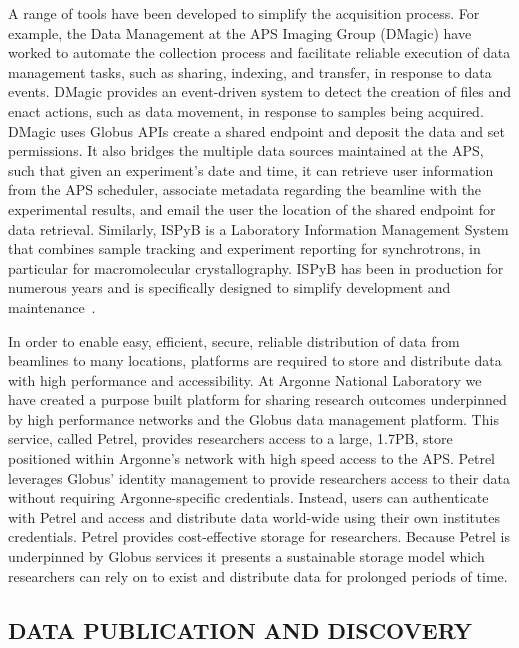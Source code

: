 \documentclass{aip-cp}
\begin{document}
A range of tools have been developed to simplify the acquisition process. For example, the Data 
Management at the APS Imaging Group (DMagic) have worked to automate the collection process and 
facilitate reliable execution of data management tasks, such as sharing, indexing, and transfer, in 
response to data events. DMagic provides an event-driven system to detect the creation of files and 
enact actions, such as data movement, in response to samples being acquired. DMagic uses Globus 
APIs create a shared endpoint and deposit the data and set permissions. It also bridges the 
multiple data sources maintained at the APS, such that given an experiment's date and time, it can 
retrieve user information from the APS scheduler, associate metadata regarding the beamline with 
the experimental results, and email the user the location of the shared endpoint for data 
retrieval. Similarly, ISPyB is a 
Laboratory Information Management System that combines sample tracking and experiment 
reporting for synchrotrons, in particular for macromolecular crystallography. ISPyB has been in 
production for numerous years and is specifically designed to simplify development and 
maintenance~\cite{delageniere2011ispyb}.


In order to enable easy, efficient, secure, reliable distribution of data from beamlines to many 
locations, platforms are required to store and distribute data with high performance and 
accessibility. At Argonne National Laboratory we have created a purpose built platform for sharing 
research outcomes underpinned by high performance networks and the Globus data management platform. 
This service, called Petrel, provides researchers access to a large, 1.7PB, store positioned within 
Argonne's network with high speed access to the APS. Petrel leverages Globus' identity management 
to provide researchers access to their data without requiring Argonne-specific credentials. 
Instead, users can authenticate with Petrel and access and distribute data world-wide using their 
own institutes credentials. Petrel provides cost-effective storage for researchers. Because Petrel 
is underpinned by Globus services it presents a sustainable storage model which researchers can 
rely on to exist and distribute data for prolonged periods of time.


\subsection{DATA PUBLICATION AND DISCOVERY}
\end{document}

